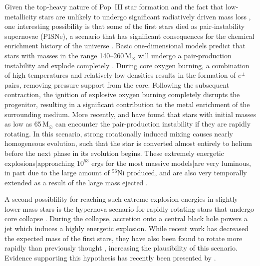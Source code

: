 \documentclass{thesis}
\newcommand{\msun}{\ensuremath{\,\mathrm{M}_{\odot}}\xspace}
\begin{document}
Given the top-heavy nature of Pop~III star formation and the fact that
low-metallicity stars are unlikely to undergo significant radiatively
driven mass loss \citep{Kudritzki2002}, one interesting possibility is
that some of the first stars died as pair-instability supernovae
(PISNe), a scenario that has significant consequences for the chemical
enrichment history of the universe \citep{HegerWoosley2002,
  TumlinsonVenkatesanShull2004, KarlssonJohnsonBromm2008}.  Basic
one-dimensional models predict that stars with masses in the range
140--260\msun will undergo a pair-production instability and explode
completely \citep{BarkatRakavySack1967, Fraley1968}.  During core
oxygen burning, a combination of high temperatures and relatively low
densities results in the formation of $e^{\pm}$ pairs, removing
pressure support from the core. Following the subsequent contraction,
the ignition of explosive oxygen burning completely disrupts the
progenitor, resulting in a significant contribution to the metal
enrichment of the surrounding medium. More recently,
\citet{ChatzopoulosWheeler2012} and \citet{YoonDierksLanger2012} have
found that stars with initial masses as low as 65\msun can encounter
the pair-production instability if they are rapidly rotating.  In this
scenario, strong rotationally induced mixing causes nearly homogeneous
evolution, such that the star is converted almost entirely to helium
before the next phase in its evolution begins.  These extremely
energetic explosions|approaching $10^{53}$ ergs for the most massive
models|are very luminous, in part due to the large amount of $^{56}$Ni
produced, and are also very temporally extended as a result of the
large mass ejected \citep{FryerWoosleyHeger2001, HegerWoosley2002,
  Hegeretal2003, JoggerstWhalen2011, KasenWoosleyHeger2011}.

A second possiblility for reaching such extreme explosion energies in
slightly lower mass stars is the hypernova scenario for rapidly
rotating stars that undergo core collapse \citep{UmedaNomoto2003,
  TominagaUmedaNomoto2007}.  During the collapse, accretion onto a
central black hole powers a jet which induces a highly energetic
explosion. While recent work has decreased the expected mass of the
first stars, they have also been found to rotate more rapidly than
previously thought \citep{StacyBrommLoeb2011}, increasing the
plausibility of this scenario. Evidence supporting this hypothesis has
recently been presented by \citet{Chiappinietal2011}.
\end{document}
